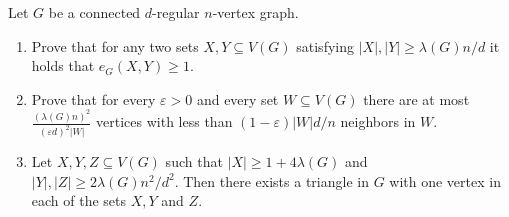 \documentclass[a4paper, 11pt, oneside]{article}
\newenvironment{problem}[1]
  {\renewcommand\theinnercustomprob{#1}\innercustomprob}
  {\endinnercustomprob}
\newcommand\abs[1]{\left|#1\right|}
\begin{document}
 \begin{problem}{7}\label{problem7}
 Let $G$ be a connected $d$-regular $n$-vertex graph.
 \begin{enumerate}
 \item Prove that for any two sets $X,Y \subseteq V(G)$ satisfying $\abs{X},\abs{Y} \geq \lambda(G)n/d$ it holds that $e_G(X,Y)\geq 1$.
 \item Prove that for every $\varepsilon > 0$ and every set $W \subseteq V(G)$ there are at most $\frac{(\lambda(G)n)^2}{(\varepsilon d)^2\abs{W}}$ vertices with less than $(1 - \varepsilon)\abs{W}d/n$ neighbors in $W$.
 \item Let $X,Y,Z \subseteq V(G)$ such that $\abs{X} \geq 1 + 4\lambda(G)$ and $\abs{Y},\abs{Z} \geq 2\lambda(G)n^2/d^2$. Then there exists a triangle in $G$ with one vertex in each of the sets $X,Y$ and $Z$. 
 \end{enumerate}
 
\end{problem}

\hfill\break
\end{document}
